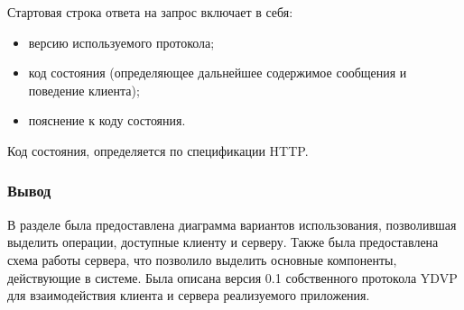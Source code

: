 Стартовая строка ответа на запрос включает в себя:
\begin{itemize}[leftmargin=1.6\parindent]
\item версию используемого протокола;
\item код состояния (определяющее дальнейшее содержимое сообщения и поведение клиента);
\item пояснение к коду состояния.
\end{itemize}

Код состояния, определяется по спецификации HTTP.

\subsubsection*{Вывод}
В разделе была предоставлена диаграмма вариантов использования, позволившая выделить операции, доступные клиенту и серверу. Также была предоставлена схема работы сервера, что позволило выделить основные компоненты, действующие в системе. Была описана версия 0.1 собственного протокола YDVP для взаимодействия клиента и сервера реализуемого приложения.

\pagebreak